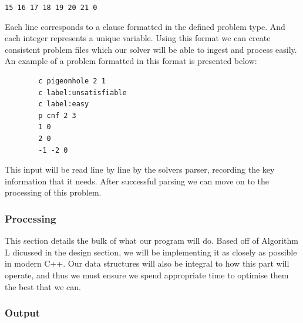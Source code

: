 \documentclass{article}
\begin{document}
\begin{center}
    \texttt{15 16 17 18 19 20 21 0}
\end{center}

Each line corresponds to a clause formatted in the defined problem type. And each integer represents
a unique variable. Using this format we can create consistent problem files which our solver will be
able to ingest and process easily. An example of a problem formatted in this format is presented
below:

\begin{center}
    \begin{lstlisting}
        c pigeonhole 2 1
        c label:unsatisfiable
        c label:easy
        p cnf 2 3
        1 0
        2 0
        -1 -2 0
    \end{lstlisting}
\end{center}

This input will be read line by line by the solvers parser, recording the key information that it
needs. After successful parsing we can move on to the processing of this problem.

\subsubsection{Processing}
This section details the bulk of what our program will do. Based off of Algorithm L dicussed in the design section, we will be
implementing it as closely as possible in modern C++. Our data structures will also be integral to how this part will operate, and
thus we must ensure we spend appropriate time to optimise them the best that we can.




\subsubsection{Output}
\end{document}
